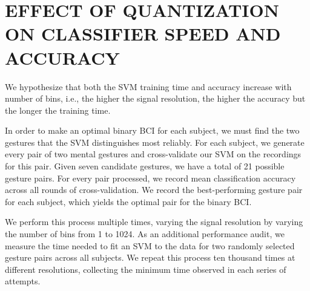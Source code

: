 \section{\uppercase{Effect of quantization on classifier speed and accuracy}}
\label{sec:quantization_eval}


We hypothesize that both the SVM training time and accuracy increase with number of bins, i.e., the higher the signal resolution, the higher the accuracy but the longer the training time.



In order to make an optimal binary BCI for each subject, we must find the two gestures that the SVM distinguishes most reliably. For each subject, we generate every pair of two mental gestures and cross-validate our SVM on the recordings for this pair. Given seven candidate gestures, we have a total of 21 possible gesture pairs. For every pair processed, we record mean classification accuracy across all rounds of cross-validation. We record the best-performing gesture pair for each subject, which yields the optimal pair for the binary BCI.

We perform this process multiple times, varying the signal resolution by varying the number of bins from 1 to 1024. As an additional performance audit, we measure the time needed to fit an SVM to the data for two randomly selected gesture pairs across all subjects. We repeat this process ten thousand times at different resolutions, collecting the minimum time observed in each series of attempts.


